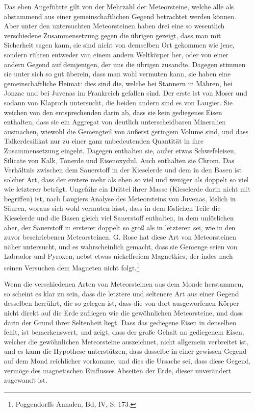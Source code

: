 \documentclass[a4paper, 11pt, oneside]{article}
\begin{document}
Das eben Angeführte gilt von der Mehrzahl der Meteorsteine, welche alle als abstammend aus einer gemeinschaftlichen Gegend betrachtet werden können. Aber unter den untersuchten Meteorsteinen haben drei eine so wesentlich verschiedene Zusammensetzung gegen die übrigen gezeigt, dass man mit Sicherheit sagen kann, sie sind nicht von demselben Ort gekommen wie jene, sondern rühren entweder van einem andern Weltkörper her, oder von einer andern Gegend auf demjenigen, der uns die übrigen zusandte. Dagegen stimmen sie unter sich so gut überein, dass man wohl vermuten kann, sie haben eine gemeinschaftliche Heimat: dies sind die, welche bei Stannern in Mähren, bei Jonzac und bei Juvenas im Frankreich gefallen sind. Der erste ist von Moser und sodann von Klaproth untersucht, die beiden andern sind es von Laugier. Sie weichen von den entsprechenden darin ab, dass sie kein gediegenes Eisen enthalten, dass sie ein Aggregat von deutlich unterscheidbaren Mineralien ausmachen, wiewohl die Gemengteil von äußerst geringem Volume sind, und dass Talkerdesilikat nur zu einer ganz unbedeutenden Quantität in ihre Zusammensetzung eingeht. Dagegen enthalten sie, außer etwas Schwefeleisen, Silicate von Kalk, Tonerde und Eisenoxydul. Auch enthalten sie Chrom. Das Verhältnis zwischen dem Sauerstoff in der Kieselerde und dem in den Basen ist solcher Art, dass der erstere mehr als eben so viel und weniger als doppelt so viel wie letzterer beträgt. Ungefähr ein Drittel ihrer Masse (Kieselerde darin nicht mit begriffen) ist, nach Laugiers Analyse des Meteorsteins von Juvenas, löslich in Säuren, woraus sich wohl vermuten lässt, dass in dem löslichen Teile die Kieselerde und die Basen gleich viel Sauerstoff enthalten, in dem unlöslichen aber, der Sauerstoff in ersterer doppelt so groß als in letzteren sei, wie.in den zuvor beschriebenen Meteorsteinen. G. Rose hat diese Art von Meteorsteinen näher untersucht, und es wahrscheinlich gemacht, dass sie Gemenge seien von Labrador und Pyroxen, nebst etwas nickelfreiem Magnetkies, der indes nach seinen Versuchen dem Magneten nicht folgt.\footnote{Poggendorffs Annalen, Bd, IV, S. 173.}

Wenn die verschiedenen Arten von Meteorsteinen aus dem Monde herstammen, so scheint es klar zu sein, dass die letztere und seltenere Art aus einer Gegend desselben herrührt, die so gelegen ist, dass die von dort ausgeworfenen Körper nicht direkt auf die Erde zufliegen wie die gewöhnlichen Meteorsteine, und dass darin der Grund ihrer Seltenheit liegt. Dass das gediegene Eisen in denselben fehlt, ist bemerkenswert, und zeigt, dass der große Gehalt an gediegenem Eisen, welcher die gewöhnlichen Meteorsteine auszeichnet, nicht allgemein verbreitet ist, und es kann die Hypothese unterstützen, dass dasselbe in einer gewissen Gegend auf dem Mond reichlicher vorkomme, und dies die Ursache sei, dass diese Gegend, vermöge des magnetischen Einflusses Abseiten der Erde, dieser unverändert zugewandt ist.
\end{document}
